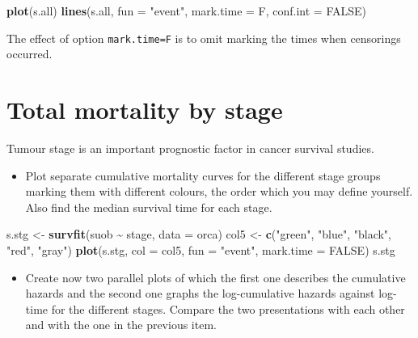 \documentclass[
]{book}
\newenvironment{Shaded}{\begin{snugshade}}{\end{snugshade}}
\newcommand{\AttributeTok}[1]{\textcolor[rgb]{0.13,0.29,0.53}{#1}}
\newcommand{\ConstantTok}[1]{\textcolor[rgb]{0.56,0.35,0.01}{#1}}
\newcommand{\FunctionTok}[1]{\textcolor[rgb]{0.13,0.29,0.53}{\textbf{#1}}}
\newcommand{\NormalTok}[1]{#1}
\newcommand{\OtherTok}[1]{\textcolor[rgb]{0.56,0.35,0.01}{#1}}
\newcommand{\SpecialCharTok}[1]{\textcolor[rgb]{0.81,0.36,0.00}{\textbf{#1}}}
\newcommand{\StringTok}[1]{\textcolor[rgb]{0.31,0.60,0.02}{#1}}
\providecommand{\tightlist}{%
  \setlength{\itemsep}{0pt}\setlength{\parskip}{0pt}}
\begin{document}
\begin{Shaded}
\begin{Highlighting}[]
\FunctionTok{plot}\NormalTok{(s.all)}
\FunctionTok{lines}\NormalTok{(s.all, }\AttributeTok{fun =} \StringTok{"event"}\NormalTok{, }\AttributeTok{mark.time =}\NormalTok{ F, }\AttributeTok{conf.int =} \ConstantTok{FALSE}\NormalTok{)}
\end{Highlighting}
\end{Shaded}

The effect of option \texttt{mark.time=F} is to omit
marking the times when censorings occurred.

\section{Total mortality by stage}\label{total-mortality-by-stage}

Tumour stage is an important prognostic factor in cancer survival studies.

\begin{itemize}
\tightlist
\item
  Plot separate cumulative mortality curves for the different stage groups
  marking them with different colours, the order which you may define yourself.
  Also find the median survival time for each stage.
\end{itemize}

\begin{Shaded}
\begin{Highlighting}[]
\NormalTok{s.stg }\OtherTok{\textless{}{-}} \FunctionTok{survfit}\NormalTok{(suob }\SpecialCharTok{\textasciitilde{}}\NormalTok{ stage, }\AttributeTok{data =}\NormalTok{ orca)}
\NormalTok{col5 }\OtherTok{\textless{}{-}} \FunctionTok{c}\NormalTok{(}\StringTok{"green"}\NormalTok{, }\StringTok{"blue"}\NormalTok{, }\StringTok{"black"}\NormalTok{, }\StringTok{"red"}\NormalTok{, }\StringTok{"gray"}\NormalTok{)}
\FunctionTok{plot}\NormalTok{(s.stg, }\AttributeTok{col =}\NormalTok{ col5, }\AttributeTok{fun =} \StringTok{"event"}\NormalTok{, }\AttributeTok{mark.time =} \ConstantTok{FALSE}\NormalTok{)}
\NormalTok{s.stg}
\end{Highlighting}
\end{Shaded}

\begin{itemize}
\tightlist
\item
  Create now two parallel plots of which the first one describes the
  cumulative hazards
  and the second one graphs the log-cumulative hazards against log-time
  for the different stages. Compare the two presentations
  with each other and with the one in the previous item.
\end{itemize}
\end{document}
